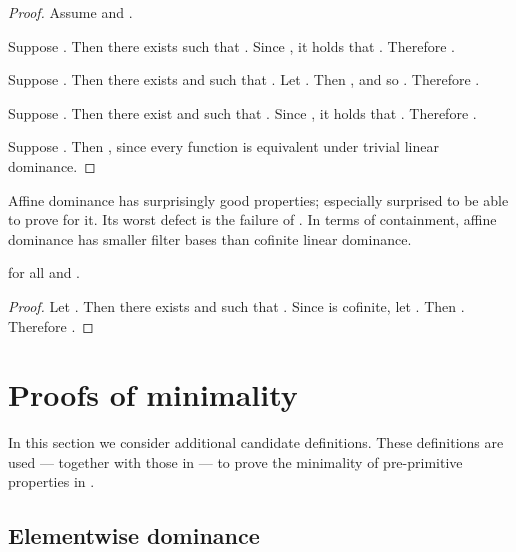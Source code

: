 \documentclass[b5paper, english, oneside]{memoir}
\begin{document}
\begin{proof}
Assume  and .

\proofpart{}
Suppose . Then there exists  such that . Since , it holds that . Therefore .

\proofpart{}
Suppose . Then there exists  and  such that . Let . Then , and so . Therefore .

\proofpart{}
Suppose . Then there exist  and  such that . Since , it holds that . Therefore .

\proofpart{}
Suppose . Then , since every function is equivalent under trivial linear dominance.
\end{proof}

Affine dominance has surprisingly good properties; \we{} \were{} especially surprised to be able to prove  for it. Its worst defect is the failure of . In terms of containment, affine dominance has smaller filter bases than cofinite linear dominance.

\begin{theorem}
\label{AffineContainment}

for all  and .
\end{theorem}

\begin{proof}
Let . Then there exists  and  such that . Since  is cofinite, let . Then . Therefore .
\end{proof}



















\chapter{Proofs of minimality}
\label{ProofsOfMinimality}

In this section we consider additional candidate definitions. These definitions are used --- together with those in  --- to prove the minimality of pre-primitive properties in .

\section{Elementwise dominance}
\label{ElementwiseDominance}
\end{document}
